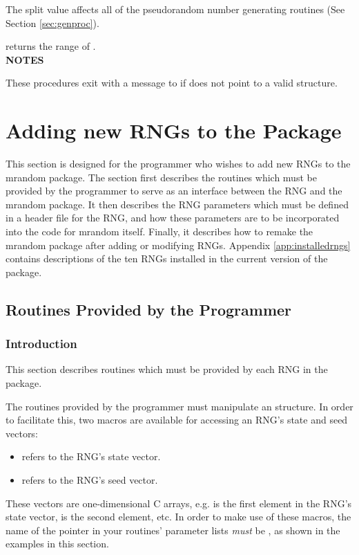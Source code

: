 The split value affects all of the pseudorandom number generating
routines (See Section \ref{sec:genproc}).

 returns the range of .\\

\noindent
{\bf NOTES}

These procedures exit with a message to  if
 does not point to a valid  structure.

\section{Adding new RNGs to the Package}

This section is designed for the programmer who wishes to add new RNGs
to the mrandom package.  The section first describes the routines which
must be provided by the programmer to serve as an interface between the
RNG and the mrandom package.  It then describes the RNG parameters which
must be defined in a header file for the RNG, and how these parameters
are to be incorporated into the code for mrandom itself.  Finally, it
describes how to remake the mrandom package after adding or modifying
RNGs.  Appendix \ref{app:installedrngs} contains descriptions of the ten
RNGs installed in the current version of the package.

\subsection{Routines Provided by the Programmer}
\label{sec:progroutines}
\subsubsection{Introduction}

This section describes routines which must be provided by each RNG in
the package.

The routines provided by the programmer must manipulate an
 structure.  In order to facilitate this, two macros are
available for accessing an RNG's state and seed vectors:
\begin{itemize}
\item {} refers to the RNG's state vector.
\item {} refers to the RNG's seed vector.
\end{itemize}
These vectors are one-dimensional C arrays, e.g.
 is the first element in the RNG's state vector,
 is the second element, etc.  In order to make use of
these macros, the name of the  pointer in your routines'
parameter lists {\em must} be , as shown in the examples in
this section.

